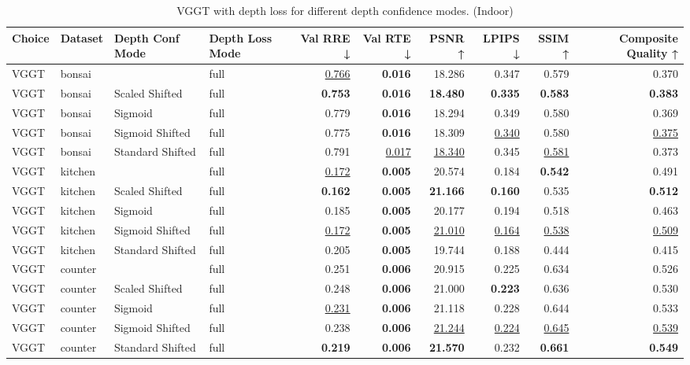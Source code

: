 \begin{table}[H]
\caption{\ifdefined\customcaption \customcaption \else VGGT with depth loss for different depth confidence modes. (Indoor) \fi}
\label{tab:05_depth_conf_mode_brief_indoor}
\centering
\scriptsize
\begin{tabular}{llllrrrrrr}
\toprule
Choice & Dataset & Depth Conf Mode & Depth Loss Mode & Val RRE ↓ & Val RTE ↓ & PSNR ↑ & LPIPS ↓ & SSIM ↑ & Composite Quality ↑ \\
\midrule
VGGT & bonsai &  & full & \underline{0.766} & \textbf{0.016} & 18.286 & 0.347 & 0.579 & 0.370 \\
VGGT & bonsai & Scaled Shifted & full & \textbf{0.753} & \textbf{0.016} & \textbf{18.480} & \textbf{0.335} & \textbf{0.583} & \textbf{0.383} \\
VGGT & bonsai & Sigmoid & full & 0.779 & \textbf{0.016} & 18.294 & 0.349 & 0.580 & 0.369 \\
VGGT & bonsai & Sigmoid Shifted & full & 0.775 & \textbf{0.016} & 18.309 & \underline{0.340} & 0.580 & \underline{0.375} \\
VGGT & bonsai & Standard Shifted & full & 0.791 & \underline{0.017} & \underline{18.340} & 0.345 & \underline{0.581} & 0.373 \\
\midrule
VGGT & kitchen &  & full & \underline{0.172} & \textbf{0.005} & 20.574 & 0.184 & \textbf{0.542} & 0.491 \\
VGGT & kitchen & Scaled Shifted & full & \textbf{0.162} & \textbf{0.005} & \textbf{21.166} & \textbf{0.160} & 0.535 & \textbf{0.512} \\
VGGT & kitchen & Sigmoid & full & 0.185 & \textbf{0.005} & 20.177 & 0.194 & 0.518 & 0.463 \\
VGGT & kitchen & Sigmoid Shifted & full & \underline{0.172} & \textbf{0.005} & \underline{21.010} & \underline{0.164} & \underline{0.538} & \underline{0.509} \\
VGGT & kitchen & Standard Shifted & full & 0.205 & \textbf{0.005} & 19.744 & 0.188 & 0.444 & 0.415 \\
\midrule
VGGT & counter &  & full & 0.251 & \textbf{0.006} & 20.915 & 0.225 & 0.634 & 0.526 \\
VGGT & counter & Scaled Shifted & full & 0.248 & \textbf{0.006} & 21.000 & \textbf{0.223} & 0.636 & 0.530 \\
VGGT & counter & Sigmoid & full & \underline{0.231} & \textbf{0.006} & 21.118 & 0.228 & 0.644 & 0.533 \\
VGGT & counter & Sigmoid Shifted & full & 0.238 & \textbf{0.006} & \underline{21.244} & \underline{0.224} & \underline{0.645} & \underline{0.539} \\
VGGT & counter & Standard Shifted & full & \textbf{0.219} & \textbf{0.006} & \textbf{21.570} & 0.232 & \textbf{0.661} & \textbf{0.549} \\
\bottomrule
\end{tabular}
\end{table}